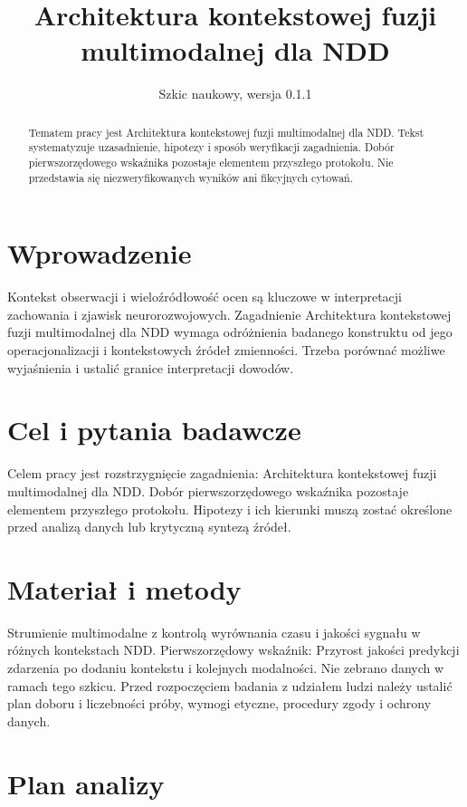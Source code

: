 \documentclass[11pt,a4paper]{article}
\title{Architektura kontekstowej fuzji multimodalnej dla NDD}
\author{}
\date{Szkic naukowy, wersja 0.1.1}
\begin{document}
\maketitle

\begin{abstract}

Tematem pracy jest Architektura kontekstowej fuzji multimodalnej dla NDD. Tekst systematyzuje uzasadnienie, hipotezy i sposób weryfikacji zagadnienia. Dobór pierwszorzędowego wskaźnika pozostaje elementem przyszłego protokołu. Nie przedstawia się niezweryfikowanych wyników ani fikcyjnych cytowań.

\end{abstract}

\section{Wprowadzenie}

Kontekst obserwacji i wieloźródłowość ocen są kluczowe w interpretacji zachowania i zjawisk neurorozwojowych. Zagadnienie Architektura kontekstowej fuzji multimodalnej dla NDD wymaga odróżnienia badanego konstruktu od jego operacjonalizacji i kontekstowych źródeł zmienności. Trzeba porównać możliwe wyjaśnienia i ustalić granice interpretacji dowodów.

\section{Cel i pytania badawcze}

Celem pracy jest rozstrzygnięcie zagadnienia: Architektura kontekstowej fuzji multimodalnej dla NDD. Dobór pierwszorzędowego wskaźnika pozostaje elementem przyszłego protokołu. Hipotezy i ich kierunki muszą zostać określone przed analizą danych lub krytyczną syntezą źródeł.

\section{Materiał i metody}

Strumienie multimodalne z kontrolą wyrównania czasu i jakości sygnału w różnych kontekstach NDD. Pierwszorzędowy wskaźnik: Przyrost jakości predykcji zdarzenia po dodaniu kontekstu i kolejnych modalności. Nie zebrano danych w ramach tego szkicu. Przed rozpoczęciem badania z udziałem ludzi należy ustalić plan doboru i liczebności próby, wymogi etyczne, procedury zgody i ochrony danych.

\section{Plan analizy}
\end{document}
